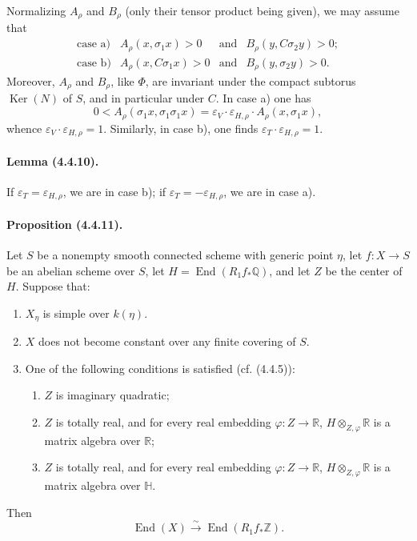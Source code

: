 \documentclass[10pt]{article}
\newcommand{\Q}{\mathbb Q}
\newcommand{\Z}{\mathbb Z}
\newcommand{\Ker}{\operatorname{Ker}}
\newcommand{\iso}{\xrightarrow{\sim}}
\newcommand{\R}{\mathbb R}
\providecommand{\End}{\operatorname{End}}
\begin{document}

Normalizing $A_\rho$ and $B_\rho$ (only their tensor product being given), we may assume that
\[
\begin{array}{llll}
\text{case a)}& A_\rho(x,\sigma_1x)>0 & \text{and} & B_\rho(y,C\sigma_2y)>0;\\[0.3em]
\text{case b)}& A_\rho(x,C\sigma_1x)>0 & \text{and} & B_\rho(y,\sigma_2y)>0.
\end{array}
\]
Moreover, $A_\rho$ and $B_\rho$, like $\Phi$, are invariant under the compact subtorus $\Ker(N)$ of $S$, and in particular under $C$. In case a) one has
\[
0<A_\rho(\sigma_1x,\sigma_1\sigma_1x)
=\varepsilon_V\cdot\varepsilon_{H,\rho}\cdot A_\rho(x,\sigma_1x),
\]
whence $\varepsilon_V\cdot\varepsilon_{H,\rho}=1$. Similarly, in case b), one finds $\varepsilon_T\cdot\varepsilon_{H,\rho}=1$.

\paragraph{Lemma (4.4.10).} If $\varepsilon_T=\varepsilon_{H,\rho}$, we are in case b); if $\varepsilon_T=-\varepsilon_{H,\rho}$, we are in case a).

\paragraph{Proposition (4.4.11).} Let $S$ be a nonempty smooth connected scheme with generic point $\eta$, let $f:X\to S$ be an abelian scheme over $S$, let $H=\End(R_1f_*\Q)$, and let $Z$ be the center of $H$. Suppose that:
\begin{enumerate}[label=(\alph*)]
\item $X_\eta$ is simple over $k(\eta)$.
\item $X$ does not become constant over any finite covering of $S$.
\item One of the following conditions is satisfied (cf. (4.4.5)):
\begin{enumerate}[label=(\ensuremath{c_{\arabic*}})]
\item $Z$ is imaginary quadratic;
\item $Z$ is totally real, and for every real embedding $\varphi:Z\to\R$, $H\otimes_{Z,\varphi}\R$ is a matrix algebra over $\R$;
\item $Z$ is totally real, and for every real embedding $\varphi:Z\to\R$, $H\otimes_{Z,\varphi}\R$ is a matrix algebra over $\mathbb H$.
\end{enumerate}
\end{enumerate}
Then
\[
\End(X)\iso\End(R_1f_*\Z).
\]
\end{document}
